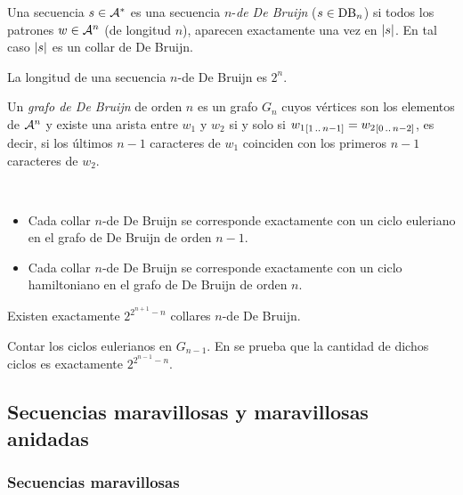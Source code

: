 \documentclass[11pt]{article}
\begin{document}
\begin{defi}
	Una secuencia $s \in \mathcal{A}^*$ es una secuencia $n$-\emph{de De Bruijn}
	($s \in \text{DB}_{n}$) si todos los patrones $w \in \mathcal{A}^n$ (de longitud $n$),
	aparecen exactamente una vez en $\left\vert s\right\vert$. En tal caso $\left\vert s\right\vert$ es un
	collar de De Bruijn.
\end{defi}

\begin{obs}
	La longitud de una secuencia $n$-de De Bruijn es $2^n$.
\end{obs}

\begin{defi}
	Un \emph{grafo de De Bruijn} de orden $n$ es un grafo $G_n$ cuyos vértices
	son los elementos de $\mathcal{A}^n$ y existe una arista entre $w_1$ y $w_2$ si
	y solo si ${w_1}_{[1\,..\,n-1]} = {w_2}_{[0\,..\,n-2]}$, es decir, si los
	últimos $n-1$ caracteres de $w_1$ coinciden con los primeros $n-1$ caracteres
	de $w_2$.
\end{defi}

\begin{obs}\ %
	\begin{itemize}
		\item Cada collar $n$-de De Bruijn se corresponde exactamente con un ciclo
		      euleriano en el grafo de De Bruijn de orden $n - 1$.
		\item Cada collar $n$-de De Bruijn se corresponde exactamente con un ciclo
		      hamiltoniano en el grafo de De Bruijn de orden $n$.
	\end{itemize}
\end{obs}

\begin{prop}
	Existen exactamente $2^{2^{n+1} - n}$ collares $n$-de De Bruijn.
\end{prop}

\begin{demosketch}
	Contar los ciclos eulerianos en $G_{n-1}$.
	En \cite{db} se prueba que la cantidad de dichos ciclos es exactamente
	$2^{2^{n-1} - n}$.
\end{demosketch}

\subsection{Secuencias maravillosas y maravillosas anidadas}

\subsubsection{Secuencias maravillosas}
\end{document}
